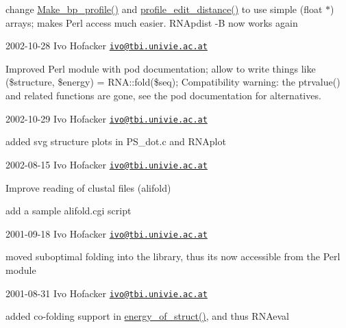 \begin{DoxyItemize}
\item change \hyperlink{profiledist_8h_a904c7eaf4a2413567c00ac4891749d18}{Make\+\_\+bp\+\_\+profile()} and \hyperlink{profiledist_8h_abe75e90e00a1e5dd8862944ed53dad5d}{profile\+\_\+edit\+\_\+distance()} to use simple (float $\ast$) arrays; makes Perl access much easier. R\+N\+Apdist -\/B now works again
\end{DoxyItemize}

2002-\/10-\/28 Ivo Hofacker \href{mailto:ivo@tbi.univie.ac.at}{\tt ivo@tbi.\+univie.\+ac.\+at}


\begin{DoxyItemize}
\item Improved Perl module with pod documentation; allow to write things like (\$structure, \$energy) = R\+N\+A\+::fold(\$seq); Compatibility warning\+: the ptrvalue() and related functions are gone, see the pod documentation for alternatives.
\end{DoxyItemize}

2002-\/10-\/29 Ivo Hofacker \href{mailto:ivo@tbi.univie.ac.at}{\tt ivo@tbi.\+univie.\+ac.\+at}


\begin{DoxyItemize}
\item added svg structure plots in P\+S\+\_\+dot.\+c and R\+N\+Aplot
\end{DoxyItemize}

2002-\/08-\/15 Ivo Hofacker \href{mailto:ivo@tbi.univie.ac.at}{\tt ivo@tbi.\+univie.\+ac.\+at}


\begin{DoxyItemize}
\item Improve reading of clustal files (alifold)
\item add a sample alifold.\+cgi script
\end{DoxyItemize}

2001-\/09-\/18 Ivo Hofacker \href{mailto:ivo@tbi.univie.ac.at}{\tt ivo@tbi.\+univie.\+ac.\+at}


\begin{DoxyItemize}
\item moved suboptimal folding into the library, thus it\textquotesingle{}s now accessible from the Perl module
\end{DoxyItemize}

2001-\/08-\/31 Ivo Hofacker \href{mailto:ivo@tbi.univie.ac.at}{\tt ivo@tbi.\+univie.\+ac.\+at}


\begin{DoxyItemize}
\item added co-\/folding support in \hyperlink{group__eval_gac2b37fea2145c94d925a3f33378ef87b}{energy\+\_\+of\+\_\+struct()}, and thus R\+N\+Aeval
\end{DoxyItemize}

